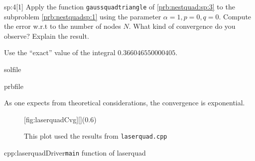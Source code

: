 \begin{samproblem}
\begin{subproblem}{sp:4}[1]
  Apply the function \verb|gaussquadtriangle| of \ref{prb:nestquad:sp:3} to the subproblem \ref{prb:nestquadsp:1} using the parameter 
  $\alpha = 1, p = 0, q = 0$.  Compute the error w.r.t to the number of nodes $N$. What kind of convergence do you observe? Explain the result.
  
  \begin{samhint}
    Use the ``exact'' value of the integral $0.366046550000405$.
  \end{samhint}
  
  \begin{samwriteprbpart}{solfile}
    \begin{writeverbatim}{prbfile}
      \begin{samsolution}
        As one expects from theoretical considerations, the convergence is exponential.
        \begin{figure}[h]
          \centering
          [fig:laserquadCvg][](0.6\textwidth)
          \caption{This plot used the results from \texttt{laserquad.cpp}}
        \end{figure}
        \begin{samcode}[C++-code]{cpp:laserquadDriver}{\texttt{main} function of laserquad}
          \small
        \end{samcode}
     \end{samsolution}
    \end{writeverbatim}
  \end{samwriteprbpart}

\end{subproblem}
\end{samproblem}
